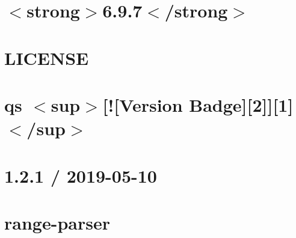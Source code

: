 \documentclass[twoside]{book}
\newcommand{\+}{\discretionary{\mbox{\scriptsize$\hookleftarrow$}}{}{}}
\begin{document}
\chapter{\texorpdfstring{$<$}{<}strong\texorpdfstring{$>$}{>}6.9.7\texorpdfstring{$<$}{<}/strong\texorpdfstring{$>$}{>}}
\label{md__c___users_vaishnavi_jadhav__desktop__developer_code_mean_stack_example_server_node_modules_qs__c_h_a_n_g_e_l_o_g}

\chapter{LICENSE}
\label{md__c___users_vaishnavi_jadhav__desktop__developer_code_mean_stack_example_server_node_modules_qs__l_i_c_e_n_s_e}

\chapter{qs \texorpdfstring{$<$}{<}sup\texorpdfstring{$>$}{>}\mbox{[}!\mbox{[}Version Badge\mbox{]}\mbox{[}2\mbox{]}\mbox{]}\mbox{[}1\mbox{]}\texorpdfstring{$<$}{<}/sup\texorpdfstring{$>$}{>}}
\label{md__c___users_vaishnavi_jadhav__desktop__developer_code_mean_stack_example_server_node_modules_qs__r_e_a_d_m_e}

\chapter{1.2.1 / 2019-\/05-\/10}
\label{md__c___users_vaishnavi_jadhav__desktop__developer_code_mean_stack_example_server_node_modules_range_parser__h_i_s_t_o_r_y}

\chapter{range-\/parser}
\label{md__c___users_vaishnavi_jadhav__desktop__developer_code_mean_stack_example_server_node_modules_range_parser__r_e_a_d_m_e}

\end{document}
